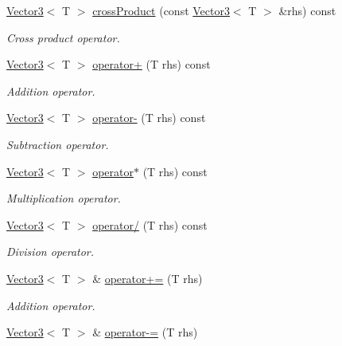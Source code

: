 \begin{DoxyCompactItemize}
\hyperlink{class_vector3}{Vector3}$<$ T $>$ \hyperlink{class_vector3_a75af980b2fd0c531b568ac9cb4021b75}{crossProduct} (const \hyperlink{class_vector3}{Vector3}$<$ T $>$ \&rhs) const 
\begin{DoxyCompactList}\small\item\em Cross product operator. \item\end{DoxyCompactList}\item 
\hyperlink{class_vector3}{Vector3}$<$ T $>$ \hyperlink{class_vector3_a493cc48a44398ad7cc8ad2e056637e80}{operator+} (T rhs) const 
\begin{DoxyCompactList}\small\item\em Addition operator. \item\end{DoxyCompactList}\item 
\hyperlink{class_vector3}{Vector3}$<$ T $>$ \hyperlink{class_vector3_a2cecabf7b0a25697794c320e2c179a42}{operator-\/} (T rhs) const 
\begin{DoxyCompactList}\small\item\em Subtraction operator. \item\end{DoxyCompactList}\item 
\hyperlink{class_vector3}{Vector3}$<$ T $>$ \hyperlink{class_vector3_a413e0c20e64bb1313effc98a4e5f068e}{operator$\ast$} (T rhs) const 
\begin{DoxyCompactList}\small\item\em Multiplication operator. \item\end{DoxyCompactList}\item 
\hyperlink{class_vector3}{Vector3}$<$ T $>$ \hyperlink{class_vector3_a9387fe32c315ff4cdb2b612a72d901d6}{operator/} (T rhs) const 
\begin{DoxyCompactList}\small\item\em Division operator. \item\end{DoxyCompactList}\item 
\hyperlink{class_vector3}{Vector3}$<$ T $>$ \& \hyperlink{class_vector3_a337ea6437958847aeaa7ca761cc9551a}{operator+=} (T rhs)
\begin{DoxyCompactList}\small\item\em Addition operator. \item\end{DoxyCompactList}\item 
\hyperlink{class_vector3}{Vector3}$<$ T $>$ \& \hyperlink{class_vector3_a42c1be3201044a462cfd3115de8fd46e}{operator-\/=} (T rhs)

\end{DoxyCompactItemize}
